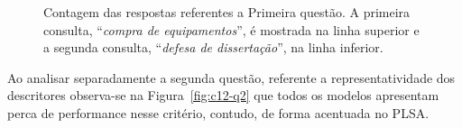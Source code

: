 \begin{figure}[!h]
	\caption{Contagem das respostas referentes a Primeira questão. A primeira consulta, ``\textit{compra de equipamentos}'', é mostrada na linha superior e a segunda consulta, ``\textit{defesa de dissertação}'', na linha inferior.}
	\label{fig:c12-q1}
\end{figure}



Ao analisar separadamente a segunda questão, referente a representatividade dos descritores observa-se na Figura~\ref{fig:c12-q2} que todos os modelos apresentam perca de performance nesse critério, contudo, de forma acentuada no PLSA. 



\begin{figure}[!h] \centering     %

\end{figure}
